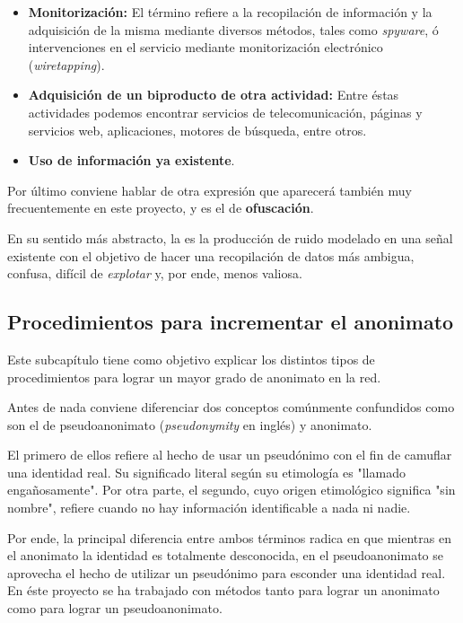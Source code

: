 \begin{itemize}
	\item {\textbf{Monitorización:} El término refiere a la recopilación de información y la adquisición de la misma mediante diversos métodos, tales como \textit{spyware}, ó intervenciones en el servicio mediante monitorización electrónico (\textit{wiretapping}).}
	\item {\textbf{Adquisición de un biproducto de otra actividad:} Entre éstas actividades podemos encontrar servicios de telecomunicación, páginas y servicios web, aplicaciones, motores de búsqueda, entre otros.} 
	\item {\textbf{Uso de información ya existente}.}
\end{itemize} 

Por último conviene hablar de otra expresión que aparecerá también muy frecuentemente en este proyecto, y es el de \textbf{ofuscación}.

En su sentido más abstracto, la  es la producción de ruido modelado en una señal existente con el objetivo de hacer una recopilación de datos más ambigua, confusa, difícil de \textit{explotar} y, por ende, menos valiosa.

\subsection{Procedimientos para incrementar el anonimato}

Este subcapítulo tiene como objetivo explicar los distintos tipos de procedimientos para lograr un mayor grado de anonimato en la red. 

Antes de nada conviene diferenciar dos conceptos comúnmente confundidos como son el de pseudoanonimato (\textit{pseudonymity} en inglés) y anonimato. ~\cite{article:anopseudo}

El primero de ellos refiere al hecho de usar un pseudónimo con el fin de camuflar una identidad real. Su significado literal según su etimología es  "llamado engañosamente".
Por otra parte, el segundo, cuyo origen etimológico significa "sin nombre", refiere cuando no hay información identificable a nada ni nadie.

Por ende, la principal diferencia entre ambos términos radica en que mientras en el anonimato la identidad es totalmente desconocida, en el pseudoanonimato se aprovecha el hecho de utilizar un pseudónimo para esconder una identidad real. 
En éste proyecto se ha trabajado con métodos tanto para lograr un anonimato como para lograr un pseudoanonimato.

